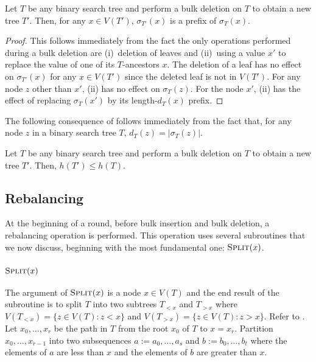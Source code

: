 \documentclass[kpfonts]{patmorin}
\let\le\leqslant
\begin{document}
\begin{lem}
  Let $T$ be any binary search tree and perform a bulk deletion on $T$ to obtain a new tree $T'$.  Then, for any $x\in V(T')$, $\sigma_{T'}(x)$ is a prefix of $\sigma_T(x)$.
\end{lem}

\begin{proof}
  This follows immediately from the fact the only operations performed during a bulk deletion are (i)~deletion of leaves and (ii)~using a value $x'$ to replace the value of one of its $T$-ancestors $x$.  The deletion of a leaf has no effect on $\sigma_{T'}(x)$ for any $x\in V(T')$ since the deleted leaf is not in $V(T')$.  For any node $z$ other than $x'$, (ii) has no effect on $\sigma_T(z)$.  For the node $x'$, (ii) has the effect of replacing $\sigma_T(x')$ by its length-$d_T(x)$ prefix.  
\end{proof}

The following consequence of  follows immediately from the fact that, for any node $z$ in a binary search tree $T$, $d_T(z)=|\sigma_T(z)|$.

\begin{lem}
  Let $T$ be any binary search tree and perform a bulk deletion on $T$ to obtain a new tree $T'$.  Then, $h(T')\le h(T)$.
\end{lem}


\subsection{Rebalancing}

At the beginning of a round, before bulk insertion and bulk deletion, a rebalancing operation is performed.  This operation uses several subroutines that we now discuss, beginning with the most fundamental one:  $\textsc{Split}(x)$.

\subsubsection{$\textsc{Split}(x)$}

The argument of $\textsc{Split}(x)$ is a node $x\in V(T)$ and the end result of the subroutine is to split $T$ into two subtrees $T_{<x}$ and $T_{>x}$ where $V(T_{<x})=\{z\in V(T): z<x\}$ and $V(T_{>x})=\{z\in V(T): z>x\}$. Refer to .  Let $x_0,\ldots,x_r$ be the path in $T$ from the root $x_0$ of $T$ to $x=x_r$.  Partition $x_0,\ldots,x_{r-1}$ into two subsequences $a:=a_0,\ldots,a_s$ and $b:=b_0,\ldots,b_t$ where the elements of $a$ are less than $x$ and the elements of $b$ are greater than $x$.
\end{document}
